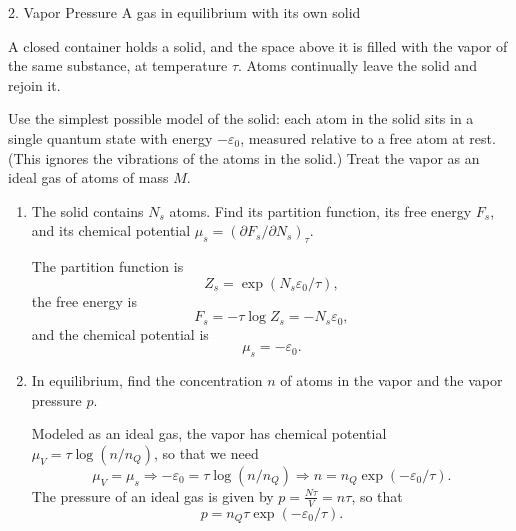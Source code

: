 \documentclass[11pt]{article}
\begin{document}
\begin{problem}{2. Vapor Pressure}
A gas in equilibrium with its own solid

A closed container holds a solid, and the space above it is filled with the vapor of the same substance, at temperature \(\tau\).
Atoms continually leave the solid and rejoin it.

Use the simplest possible model of the solid: each atom in the solid sits in a single quantum state with energy \(-\varepsilon_0\), measured relative to a free atom at rest.
(This ignores the vibrations of the atoms in the solid.)
Treat the vapor as an ideal gas of atoms of mass \(M\).
\begin{enumerate}[label=(\alph*)]
  \item The solid contains \(N_s\) atoms.
  Find its partition function, its free energy \(F_s\), and its chemical potential \(\mu_s=(\partial F_s/\partial N_s)_\tau\).
        \begin{answer}
          The partition function is
          \begin{equation}
          \label{eq:4}
          Z_{s} = \exp(N_s\varepsilon_0/\tau),
        \end{equation}
        the free energy is
        \begin{equation}
        \label{eq:5}
        F_s = -\tau\log Z_s = -N_{s}\varepsilon_{0},
      \end{equation}
      and the chemical potential is
      \begin{equation}
      \label{eq:6}
      \mu_s = -\varepsilon_{0}.
      \end{equation}
        \end{answer}
  \item In equilibrium, find the concentration \(n\) of atoms in the vapor and the vapor pressure \(p\).
        \begin{answer}
          Modeled as an ideal gas, the vapor has chemical potential \( \mu_{V} = \tau\log(n/n_Q) \), so that we need
          \begin{equation}
          \label{eq:7}
          \mu_V = \mu_s \Rightarrow -\varepsilon_0 = \tau\log(n/n_{Q}) \Rightarrow \boxed{n = n_Q\exp(-\varepsilon_0/\tau).}
        \end{equation}
        The pressure of an ideal gas is given by \( p = \frac{N\tau}{V} = n\tau \), so that
        \begin{equation}
        \label{eq:8}
        p = n_Q\tau\exp(-\varepsilon_0/\tau).
        \end{equation}

\end{answer}
\end{enumerate}
\end{problem}
\end{document}
